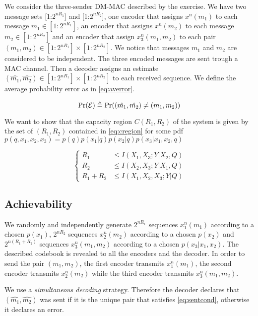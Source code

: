 
We consider the three-sender DM-MAC described by the exercise. We have two message sets [1:$2^{nR_1}$] and [1:$2^{nR_2}$], one encoder that assigns $x^n(m_1)$ to each message $m_1 \in [1:2^{nR_1}]$, an encoder that assigns $x^n(m_2)$ to each message $m_2 \in [1:2^{nR_2}]$ and an encoder that assign $x_3^n(m_1,m_2)$ to each pair $(m_1,m_2) \in [1:2^{nR_1}] \times [1:2^{nR_2}]$. We notice that messages $m_1$ and $m_2$ are considered to be independent. The three encoded messages are sent trough a MAC channel. Then a decoder assigns an estimate $(\hat{m_1},\hat{m_2}) \in [1:2^{nR_1}] \times [1:2^{nR_2}]$ to each received sequence. We define the average probability error as in \eqref{eq:averror}.

\begin{equation}
	\Pr(\mathcal{E}) \triangleq\Pr((\hat{m_1},\hat{m_2}) \neq (m_1,m_2))
	\label{eq:averror}
\end{equation}

We want to show that the capacity region $C(R_1, R_2)$ of the system is given by the set of $(R_1,R_2)$ contained in \eqref{eq:cregion} for some pdf $p(q,x_1,x_2,x_3)=p(q)p(x_1|q)p(x_2|q)p(x_3|x_1,x_2,q)$

\begin{equation}
	\begin{cases}
		R_1 &\leq I(X_1,X_3;Y|X_2,Q) \\
		R_2 &\leq I(X_2,X_3;Y|X_1,Q) \\
		R_1+R_2 &\leq I(X_1,X_2,X_3;Y|Q)
	\end{cases}
	\label{eq:cregion}
\end{equation}

\subsection{Achievability}

We randomly and independently generate $2^{nR_1}$ sequences $x_1^n(m_1)$ according to a chosen $p(x_1)$, $2^{nR_2}$ sequences $x_2^n(m_2)$ according to a chosen $p(x_2)$ and $2^{n(R_1+R_2)}$ sequences $x_3^n(m_1,m_2)$ according to a chosen $p(x_3|x_1,x_2)$. The described codebook is revealed to all the encoders and the decoder. In order to send the pair $(m_1,m_2)$, the first encoder transmits $x_1^n(m_1)$, the second encoder transmits $x_2^n(m_2)$ while the third encoder transmits $x_3^n(m_1,m_2)$.

We use a \textit{simultaneous decoding} strategy. Therefore the decoder declares that $(\hat{m_1},\hat{m_2})$ was sent if it is the unique pair that satisfies \eqref{eq:sentcond}, otherwise it declares an error.

